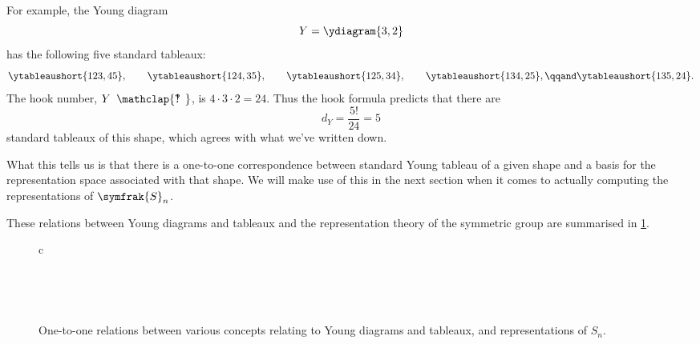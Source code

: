 \documentclass[fleqn]{NotesClass}
\newcommand{\symmetricGroup}[1][n]{\symfrak{S}_{#1}}
\newcommand{\hooknumber}[1]{#1{\phantom{?}\mkern1mu\mathclap{\ooalign{\hfil ? \hfil \cr \hfil ! \hfil}}}}
\begin{document}
    For example, the Young diagram
    \begin{equation}
        Y = \ydiagram{3,2}
    \end{equation}
    has the following five standard tableaux:
    \begin{equation}
        \ytableaushort{123,45}, \qquad \ytableaushort{124,35}, \qquad \ytableaushort{125,34}, \qquad \ytableaushort{134,25}, \qqand \ytableaushort{135,24}.
    \end{equation}
    The hook number, \(\hooknumber{Y}\), is \(4 \cdot 3 \cdot 2 = 24\).
    Thus the hook formula predicts that there are
    \begin{equation}
        d_Y = \frac{5!}{24} = 5
    \end{equation}
    standard tableaux of this shape, which agrees with what we've written down.
    
    What this tells us is that there is a one-to-one correspondence between standard Young tableau of a given shape and a basis for the representation space associated with that shape.
    We will make use of this in the next section when it comes to actually computing the representations of \(\symmetricGroup\).
    
    These relations between Young diagrams and tableaux and the representation theory of the symmetric group are summarised in \cref{fig:one-to-one relations in Sn}.
    
    \begin{figure}
        \tikzexternaldisable
        \begin{tabular}{c}
            \\[10ex]
            \\[2ex]
        \end{tabular}
        \tikzexternalenable
        \caption{One-to-one relations between various concepts relating to Young diagrams and tableaux, and representations of \(S_n\).}
        \label{fig:one-to-one relations in Sn}
    \end{figure}
    
\end{document}
